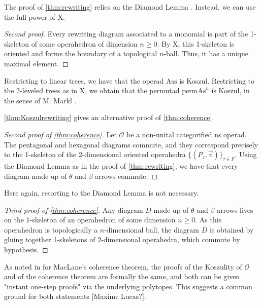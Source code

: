 \documentclass[10pt]{amsart}
\theoremstyle{definition}
\theoremstyle{remark}
\numberwithin{equation}{section}
\newcommand{\0}{\color{blue}{\mathsf{0}}}
\begin{document}
The proof of \cref{thm:rewriting} relies on the Diamond Lemma \cite[Theorem 8.5.5]{LodayVallette12}. Instead, we can use the full power of X.

\begin{proof}[Second proof] Every rewriting diagram associated to a monomial is part of the 1-skeleton of some operahedron of dimension $n\geq 0$. By X, this 1-skeleton is oriented and forms the boundary of a topological $n$-ball. Thus, it has a unique maximal element. 
\end{proof}

Restricting to linear trees, we have that the operad $\mathrm{Ass}$ is Koszul. Restricting to the 2-leveled trees as in X, we obtain that the permutad $\mathrm{permAs}^h$ is Koszul, in the sense of M. Markl \cite[Definition 21]{Markl19}.

\medskip

\cref{thm:Koszulrewriting} gives an alternative proof of \cref{thm:coherence}. 

\begin{proof}[Second proof of {\cref{thm:coherence}}] Let $\mathcal{O}$ be a non-unital categorified ns operad. The pentagonal and hexagonal diagrams commute, and they correspond precisely to the 1-skeleton of the 2-dimensional oriented operahedra $\{(P_\tau,\vec v)\}_{\tau \in F}$. Using the Diamond Lemma as in the proof of \cref{thm:rewriting}, we have that every diagram made up of $\theta$ and $\beta$ arrows commute. 
\end{proof}

Here again, resorting to the Diamond Lemma is not necessary.

\begin{proof}[Third proof of {\cref{thm:coherence}}] Any diagram $D$ made up of $\theta$ and $\beta$ arrows lives on the 1-skeleton of an operahedron of some dimension $n\geq 0$. As this operahedron is topologically a $n$-dimensional ball, the diagram $D$ is obtained by gluing together 1-skeletons of 2-dimensional operahedra, which commute by hypothesis.
\end{proof}

As noted in \cite[Remark p.266]{LodayVallette12} for MacLane's coherence theorem, the proofs of the Koszulity of $\mathcal{O}$ and of the coherence theorem are formally the same, and both can be given "instant one-step proofs" via the underlying polytopes. This suggests a common ground for both statements [Maxime Lucas?].
  






\end{document}
